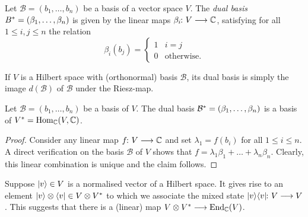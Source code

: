 \documentclass[a4paper, oneside, 12pt]{amsart}
\begin{document}
\begin{definition}\label{def:dual-basis}
  Let \(\mathcal{B} = (b_{1}, \dots , b_{n})\) be a basis of a vector space \(V\).
  The \emph{dual basis} \(\rd*{B}= (\beta_{1}, \dots , \beta_{n})\) is given by the linear maps \( \beta_{i} \from V \to \mathbb{C}\), satisfying for all \(1\leq i,j \leq n\) the relation
  \begin{equation*}
    \beta_{i}(b_{j})=
    \begin{cases}
      1 & i=j \\
      0 & \text{otherwise.}
    \end{cases}
  \end{equation*}
\end{definition}

If \(V\) is a Hilbert space with (orthonormal) basis \(\mathcal{B}\), its dual basis is simply the image \(d( \mathcal{B})\) of \(\mathcal{B}\) under the Riesz-map.

\begin{lemma}\label{lem:dual-basis-is-basis}
  Let \(\mathcal{B}= (b_{1}, \dots , b_{n})\) be a basis of \(V\).
  The dual basis \(\rd*{\mathcal{B}}= (\beta_{1}, \dots , \beta_{n})\) is a basis of \(\rd*{V}= \Hom_{ \mathbb{C}}(V, \mathbb{C})\).
\end{lemma}
\begin{proof}
  Consider any linear map \(f \from V\to \mathbb{C}\) and set \(\lambda_{1} = f(b_{i})\) for all \(1\leq i\leq n\).
  A direct verification on the basis \(\mathcal{B}\) of \(V\) shows that \(f=\lambda_{1} \beta_{1} + \dots + \lambda_{n}\beta_{n}\).
  Clearly, this linear combination is unique and the claim follows.
\end{proof}

Suppose \(\lvert v\rangle \in V\) is a normalised vector  of a Hilbert space.
It gives  rise to an element \(\ket{v} \otimes \bra{v} \in V \otimes \rd*{V}\) to which we associate the mixed state \(\ket{v}\bra{v} \from V\to V\).
This suggests that there is a (linear) map \(V \otimes \rd*{V} \to \End_{ \mathbb{C}}(V)\).
\end{document}
